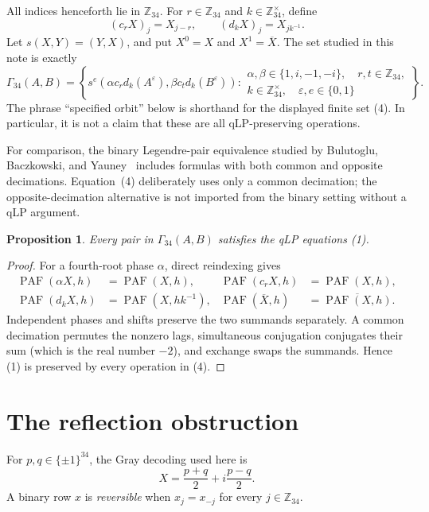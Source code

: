 \documentclass[11pt]{article}
\newtheorem{proposition}[theorem]{Proposition}
\newcommand{\Z}{\mathbb Z}
\newcommand{\PAF}{\operatorname{PAF}}
\begin{document}
All indices henceforth lie in $\Z_{34}$.  For $r\in\Z_{34}$ and
$k\in\Z_{34}^{\times}$, define
\[
 (c_rX)_j=X_{j-r},\qquad (d_kX)_j=X_{jk^{-1}}.
 \tag{3}
\]
Let $s(X,Y)=(Y,X)$, and put $X^0=X$ and $X^1=\overline X$.  The set studied
in this note is exactly
\[
 \Gamma_{34}(A,B)=
 \left\{
 s^e\!\left(\alpha c_r d_k(A^\varepsilon),
             \beta c_t d_k(B^\varepsilon)\right):
 \begin{array}{l}
 \alpha,\beta\in\{1,i,-1,-i\},\quad r,t\in\Z_{34},\\
 k\in\Z_{34}^{\times},\quad \varepsilon,e\in\{0,1\}
 \end{array}
 \right\}.
 \tag{4}
\]
The phrase ``specified orbit'' below is shorthand for the displayed finite
set (4).  In particular, it is not a claim that these are all qLP-preserving
operations.

For comparison, the binary Legendre-pair equivalence studied by Bulutoglu,
Baczkowski, and Yauney~\cite{BulutogluBaczkowskiYauney2026} includes formulas
with both common and opposite decimations.  Equation~(4) deliberately uses
only a common decimation; the opposite-decimation alternative is not imported
from the binary setting without a qLP argument.

\begin{proposition}
Every pair in $\Gamma_{34}(A,B)$ satisfies the qLP equations (1).
\end{proposition}

\begin{proof}
For a fourth-root phase $\alpha$, direct reindexing gives
\[
\begin{aligned}
 \PAF(\alpha X,h)&=\PAF(X,h),&
 \PAF(c_rX,h)&=\PAF(X,h),\\
 \PAF(d_kX,h)&=\PAF(X,hk^{-1}),&
 \PAF(\overline X,h)&=\overline{\PAF(X,h)}.
\end{aligned}
\tag{5}
\]
Independent phases and shifts preserve the two summands separately.  A
common decimation permutes the nonzero lags, simultaneous conjugation
conjugates their sum (which is the real number $-2$), and exchange swaps the
summands.  Hence (1) is preserved by every operation in (4).
\end{proof}

\section{The reflection obstruction}

For $p,q\in\{\pm1\}^{34}$, the Gray decoding used here is
\[
 X=\frac{p+q}{2}+i\frac{p-q}{2}.
 \tag{6}
\]
A binary row $x$ is \emph{reversible} when
$x_j=x_{-j}$ for every $j\in\Z_{34}$.
\end{document}
